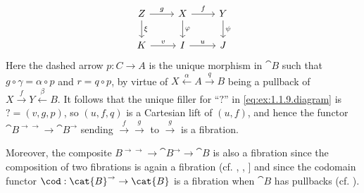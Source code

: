 \begin{solution}
\begin{equation*}
\begin{tikzcd}
Z \arrow[r, "g"] \arrow[d, "\xi"] & X \arrow[r, "f"] \arrow[d, "\varphi"] & Y \arrow[d, "\psi"] \\
K \arrow[r, "v"] & I \arrow[r, "u"] & J
\end{tikzcd}
\end{equation*}
Here the dashed arrow \(p : C \to A\) is the unique morphism in \(\cat{B}\) such that \(g \circ \gamma = \alpha \circ p\) and \(r = q \circ p\), by virtue of \(X \overset{\alpha}{\leftarrow} A \overset{q}{\rightarrow} B\) being a pullback of \(X \overset{f}{\to} Y \overset{\beta}{\leftarrow} B\).
It follows that the unique filler for ``\(?\)'' in \eqref{eq:ex:1.1.9.diagram} is \(? = (v, g, p)\), so \((u, f, q)\) is a Cartesian lift of \((u, f)\), and hence the functor \(\cat{B}^{\rightarrow\rightarrow} \to \cat{B}^\rightarrow\) sending \(\overset{f}{\to}\overset{g}{\to}\) to \(\overset{g}{\to}\) is a fibration.

Moreover, the composite \(B^{\rightarrow\rightarrow} \to \cat{B}^{\rightarrow} \to \cat{B}\) is also a fibration since the composition of two fibrations is again a fibration (cf. \cite[Proposition~8.1.12]{MR1313497}, \cite[Proposition~3.7]{MR2222646}, \cite[Proposition~3.1]{MR0213413} \cite[Proposition~9.1.10]{MR4261588}] and since the codomain functor \(\cod : \cat{B}^{\rightarrow} \to \cat{B}\) is a fibration when \(\cat{B}\) has pullbacks (cf. \cite[Proposition~1.1.6]{MR1674451}).
\end{solution}